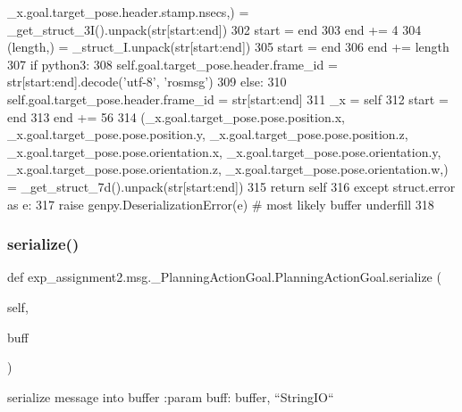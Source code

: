 \begin{DoxyCode}
      \_x.goal.target\_pose.header.stamp.nsecs,) = \_get\_struct\_3I().unpack(str[start:end])
302       start = end
303       end += 4
304       (length,) = \_struct\_I.unpack(str[start:end])
305       start = end
306       end += length
307       \textcolor{keywordflow}{if} python3:
308         self.goal.target\_pose.header.frame\_id = str[start:end].decode(\textcolor{stringliteral}{'utf-8'}, \textcolor{stringliteral}{'rosmsg'})
309       \textcolor{keywordflow}{else}:
310         self.goal.target\_pose.header.frame\_id = str[start:end]
311       \_x = self
312       start = end
313       end += 56
314       (\_x.goal.target\_pose.pose.position.x, \_x.goal.target\_pose.pose.position.y, 
      \_x.goal.target\_pose.pose.position.z, \_x.goal.target\_pose.pose.orientation.x, \_x.goal.target\_pose.pose.orientation.y, 
      \_x.goal.target\_pose.pose.orientation.z, \_x.goal.target\_pose.pose.orientation.w,) = \_get\_struct\_7d().unpack(str[start:end])
315       \textcolor{keywordflow}{return} self
316     \textcolor{keywordflow}{except} struct.error \textcolor{keyword}{as} e:
317       \textcolor{keywordflow}{raise} genpy.DeserializationError(e)  \textcolor{comment}{# most likely buffer underfill}
318 
\end{DoxyCode}
\mbox{\label{classexp__assignment2_1_1msg_1_1__PlanningActionGoal_1_1PlanningActionGoal_a35d1fc31c76c10ddd477f263b4d83b6d}} 
\subsubsection{\texorpdfstring{serialize()}{serialize()}}
{\footnotesize\ttfamily def exp\+\_\+assignment2.\+msg.\+\_\+\+Planning\+Action\+Goal.\+Planning\+Action\+Goal.\+serialize (\begin{DoxyParamCaption}\item[{}]{self,  }\item[{}]{buff }\end{DoxyParamCaption})}

\begin{DoxyVerb}serialize message into buffer
:param buff: buffer, ``StringIO``
\end{DoxyVerb}
 

